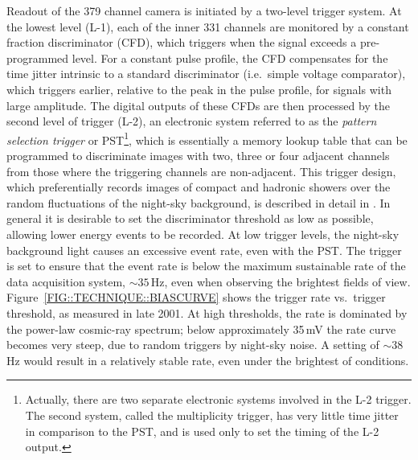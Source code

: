 Readout of the 379 channel camera is initiated by a two-level trigger
system. At the lowest level (L-1), each of the inner 331 channels are
monitored by a constant fraction discriminator (CFD), which triggers
when the signal exceeds a pre-programmed level. For a constant pulse
profile, the CFD compensates for the time jitter intrinsic to a
standard discriminator (i.e.\ simple voltage comparator), which
triggers earlier, relative to the peak in the pulse profile, for
signals with large amplitude. The digital outputs of these CFDs are
then processed by the second level of trigger (L-2), an electronic
system referred to as the \textit{pattern selection trigger} or
PST\footnote{Actually, there are two separate electronic systems
involved in the L-2 trigger. The second system, called the
multiplicity trigger, has very little time jitter in comparison to the
PST, and is used only to set the timing of the L-2 output.}, which is
essentially a memory lookup table that can be programmed to
discriminate images with two, three or four adjacent channels from
those where the triggering channels are non-adjacent. This trigger
design, which preferentially records images of compact \Gray and
hadronic showers over the random fluctuations of the night-sky
background, is described in detail in
\citet{REF::BRADBURY::1999SLC}. In general it is desirable to set the
discriminator threshold as low as possible, allowing lower energy
events to be recorded. At low trigger levels, the night-sky background
light causes an excessive event rate, even with the PST. The trigger
is set to ensure that the event rate is below the maximum sustainable
rate of the data acquisition system, $\sim35$\,Hz, even when observing
the brightest fields of view. Figure~\ref{FIG::TECHNIQUE::BIASCURVE}
shows the trigger rate vs.\ trigger threshold, as measured in late
2001. At high thresholds, the rate is dominated by the power-law
cosmic-ray spectrum; below approximately 35\,mV the rate curve becomes
very steep, due to random triggers by night-sky noise. A setting of
$\sim38$\,Hz would result in a relatively stable rate, even under the
brightest of conditions.

